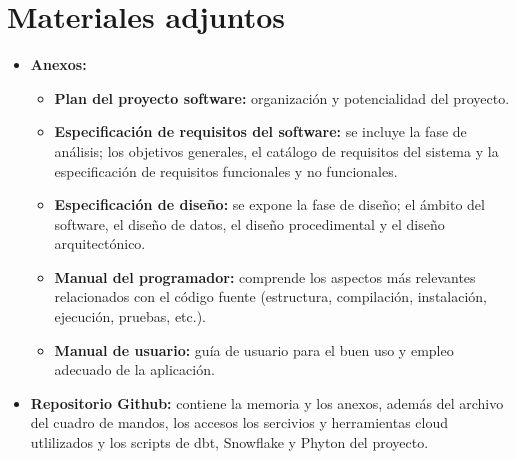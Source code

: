 \section{Materiales adjuntos}\label{materiales-adjuntos}
\begin{itemize}	
	\item \textbf{Anexos:}
	\begin{itemize}
	\tightlist
	\item
  		\textbf{Plan del proyecto software:} organización y potencialidad del proyecto.
	\item
  		\textbf{Especificación de requisitos del software:} se incluye la
  		fase de análisis; los objetivos generales, el catálogo de requisitos
  		del sistema y la especificación de requisitos funcionales y no
  		funcionales.
	\item
  		\textbf{Especificación de diseño:} se expone la fase de diseño; el
  		ámbito del software, el diseño de datos, el diseño procedimental y el
  		diseño arquitectónico.
	\item
  		\textbf{Manual del programador:} comprende los aspectos más relevantes
  		relacionados con el código fuente (estructura, compilación,
  		instalación, ejecución, pruebas, etc.).
	\item
  		\textbf{Manual de usuario:} guía de usuario para el buen uso y empleo adecuado de la aplicación.
	\end{itemize}
	
	\item \textbf{Repositorio Github:} contiene la memoria y los anexos, además del archivo del cuadro de mandos, los accesos los sercivios y herramientas cloud utlilizados y los scripts de dbt, Snowflake y Phyton del proyecto.
	
\end{itemize}
